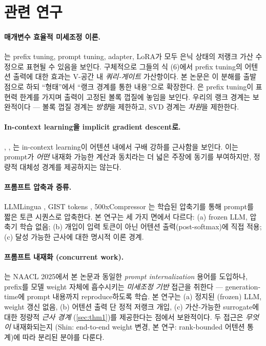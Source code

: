 \documentclass{article}
\theoremstyle{definition}
\begin{document}
\section{관련 연구}
\label{sec:related}

\paragraph{매개변수 효율적 미세조정 이론.}
\citet{he2022unified}는 prefix tuning, prompt tuning, adapter, LoRA가 모두 은닉 상태의 저랭크 가산 수정으로 표현될 수 있음을 보인다. 구체적으로 그들의 식 (6)에서 prefix tuning의 어텐션 출력에 대한 효과는 V-공간 내 \emph{쿼리-게이트} 가산항이다. 본 논문은 이 분해를 출발점으로 하되 ``형태''에서 ``랭크 경계를 통한 내용''으로 확장한다. \citet{petrov2024prompting}은 prefix tuning이 표현력 한계를 가지며 출력이 고정된 볼록 껍질에 놓임을 보인다. 우리의 랭크 경계는 보완적이다 --- 볼록 껍질 경계는 \emph{방향}을 제한하고, SVD 경계는 \emph{차원}을 제한한다.

\paragraph{In-context learning을 implicit gradient descent로.}
\citet{akyurek2023icl}, \citet{vonoswald2023icl}, \citet{ahn2023preconditioned}는 in-context learning이 어텐션 내에서 구배 강하를 근사함을 보인다. 이는 prompt가 \emph{어떤} 내재화 가능한 계산과 동치라는 더 넓은 주장에 동기를 부여하지만, 정량적 대체성 경계를 제공하지는 않는다.

\paragraph{프롬프트 압축과 증류.}
LLMLingua \citep{jiang2023llmlingua}, GIST tokens \citep{mu2023gist}, 500xCompressor \citep{li2024compressor}는 학습된 압축기를 통해 prompt를 짧은 토큰 시퀀스로 압축한다. 본 연구는 세 가지 면에서 다르다: (a) frozen LLM, 압축기 학습 없음; (b) 개입이 입력 토큰이 아닌 어텐션 출력(post-softmax)에 직접 적용; (c) 달성 가능한 근사에 대한 명시적 이론 경계.

\paragraph{프롬프트 내재화 (concurrent work).}
\citet{shin2025genpi}는 NAACL 2025에서 본 논문과 동일한 \emph{prompt internalization} 용어를 도입하나, prefix를 모델 weight 자체에 흡수시키는 \emph{미세조정 기반} 접근을 취한다 --- generation-time에 prompt 내용까지 reproduce하도록 학습. 본 연구는 (a) 정지된 (frozen) LLM, weight 갱신 없음, (b) 어텐션 출력 단 정적 저랭크 개입, (c) 가산-가능한 surrogate에 대한 정량적 \emph{근사 경계} (\cref{sec:thm1})를 제공한다는 점에서 보완적이다. 두 접근은 \emph{무엇이} 내재화되는지 (Shin: end-to-end weight 변경, 본 연구: rank-bounded 어텐션 통계)에 따라 분리된 분야를 다룬다.
\end{document}

